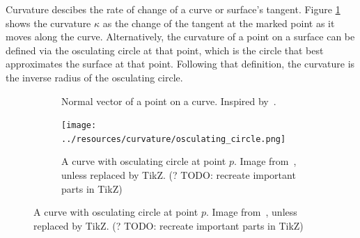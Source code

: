 Curvature descibes the rate of change of a curve or surface's tangent.
Figure \ref{sfig:tangent_on_curve} shows the curvature $\kappa$ as the change of the tangent at the marked point as it moves along the curve.
Alternatively, the curvature of a point on a surface can be defined via the osculating circle at that point, which is the circle that best approximates the surface at that point.
Following that definition, the curvature is the inverse radius of the osculating circle.

\begin{figure}[ht]
	\centering
	\begin{subfigure}{0.47\textwidth}
		\centering
{}
		\caption{%
Normal vector of a point on a curve.
Inspired by~\cite{DDGAppIntro_12_smooth_curves}.}
		\label{sfig:tangent_on_curve}
	\end{subfigure}
	\hfill
	\begin{subfigure}{0.45\textwidth}
		\centering
	\texttt{[image: ../resources/curvature/osculating\_circle.png]}
		\caption{%
A curve with osculating circle at point $p$.
Image from~\cite{DDGAppIntro_12_smooth_curves}, unless replaced by TikZ.
(? TODO: recreate important parts in TikZ)
}
	\end{subfigure}
\end{figure}

